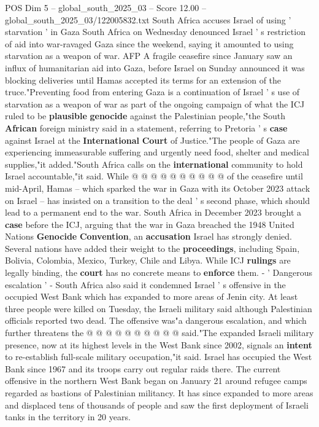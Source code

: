 \begin{textsample}{POS Dim 5 – global\_south\_2025\_03 – Score 12.00 – global\_south\_2025\_03/122005832.txt}  \label{ex:f5_pos_190}
South Africa accuses Israel of using ' starvation ' in Gaza South Africa on Wednesday denounced Israel ' s restriction of aid into war-ravaged Gaza since the weekend, saying it amounted to using starvation as a weapon of war.
AFP A fragile ceasefire since January saw an influx of humanitarian aid into Gaza, before Israel on Sunday announced it was blocking deliveries until Hamas accepted its terms for an extension of the truce."Preventing food from entering Gaza is a continuation of Israel ' s use of starvation as a weapon of war as part of the ongoing campaign of what the ICJ ruled to be \textbf{plausible} \textbf{genocide} against the Palestinian people,"the South \textbf{African} foreign ministry said in a statement, referring to Pretoria ' s \textbf{case} against Israel at the \textbf{International} \textbf{Court} of Justice."The people of Gaza are experiencing immeasurable suffering and urgently need food, shelter and medical supplies,"it added."South Africa calls on the \textbf{international} community to hold Israel accountable,"it said.
While @ @ @ @ @ @ @ @ @ @ of the ceasefire until mid-April, Hamas -- which sparked the war in Gaza with its October 2023 attack on Israel -- has insisted on a transition to the deal ' s second phase, which should lead to a permanent end to the war.
South Africa in December 2023 brought a \textbf{case} before the ICJ, arguing that the war in Gaza breached the 1948 United Nations \textbf{Genocide} \textbf{Convention}, an \textbf{accusation} Israel has strongly denied.
Several nations have added their weight to the \textbf{proceedings}, including Spain, Bolivia, Colombia, Mexico, Turkey, Chile and Libya.
While ICJ \textbf{rulings} are legally binding, the \textbf{court} has no concrete means to \textbf{enforce} them. - ' Dangerous escalation ' - South Africa also said it condemned Israel ' s offensive in the occupied West Bank which has expanded to more areas of Jenin city.
At least three people were killed on Tuesday, the Israeli military said although Palestinian officials reported two dead.
The offensive was"a dangerous escalation, and which further threatens the @ @ @ @ @ @ @ @ @ @ said."The expanded Israeli military presence, now at its highest levels in the West Bank since 2002, signals an \textbf{intent} to re-establish full-scale military occupation,"it said.
Israel has occupied the West Bank since 1967 and its troops carry out regular raids there.
The current offensive in the northern West Bank began on January 21 around refugee camps regarded as bastions of Palestinian militancy.
It has since expanded to more areas and displaced tens of thousands of people and saw the first deployment of Israeli tanks in the territory in 20 years.

\end{textsample}
